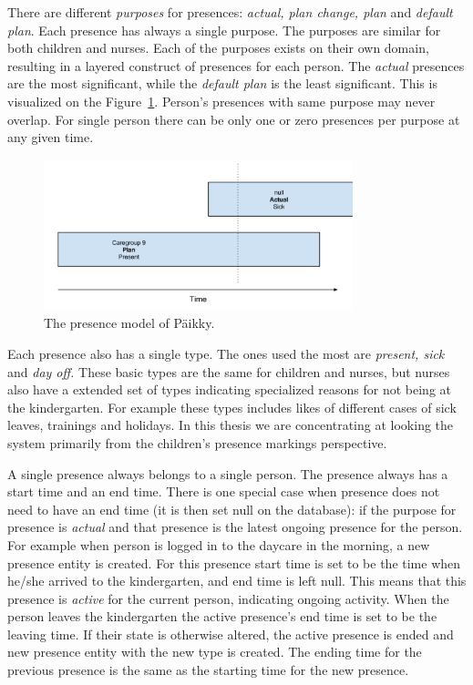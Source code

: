There are different \textit{purposes} for presences: \textit{actual, plan change, plan} and \textit{default plan}. Each presence has always a single purpose. The purposes are similar for both children and nurses. Each of the purposes exists on their own domain, resulting in a layered construct of presences for each person. The \textit{actual} presences are the most significant, while the \textit{default plan} is the least significant. This is visualized on the Figure~\ref{fig:presencemodel}. Person's presences with same purpose may never overlap. For single person there can be only one or zero presences per purpose at any given time.

\begin{figure}[t]
\begin{center}
\includegraphics[width=0.8\textwidth]{assets/presencemodel.png}
\end{center}
\caption{The presence model of Päikky.}
\label{fig:presencemodel}
\end{figure}


Each presence also has a single type. The ones used the most are \textit{present, sick} and \textit{day off.} These basic types are the same for children and nurses, but nurses also have a extended set of types indicating specialized reasons for not being at the kindergarten. For example these types includes likes of different cases of sick leaves, trainings and holidays. In this thesis we are concentrating at looking the system primarily from the children's presence markings perspective.

A single presence always belongs to a single person. The presence always has a start time and an end time. There is one special case when presence does not need to have an end time (it is then set null on the database): if the purpose for presence is \textit{actual} and that presence is the latest ongoing presence for the person. For example when person is logged in to the daycare in the morning, a new presence entity is created. For this presence start time is set to be the time when he/she arrived to the kindergarten, and end time is left null. This means that this presence is \textit{active} for the current person, indicating ongoing activity. When the person leaves the kindergarten the active presence's end time is set to be the leaving time. If their state is otherwise altered, the active presence is ended and new presence entity with the new type is created. The ending time for the previous presence is the same as the starting time for the new presence. 




